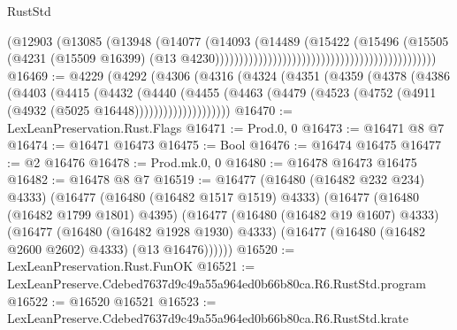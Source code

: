 \begin{lexlean}{RustStd}
\begin{coremodule}
                                                                          (@12903
                                                                            (@13085
                                                                              (@13948
                                                                                (@14077
                                                                                  (@14093
                                                                                    (@14489
                                                                                      (@15422
                                                                                        (@15496
                                                                                          (@15505
                                                                                            (@4231
                                                                                              (@15509
                                                                                                @16399)
                                                                                              (@13
                                                                                                @4230))))))))))))))))))))))))))))))))))))))))))))))
@16469 := @4229
    (@4292
      (@4306
        (@4316
          (@4324
            (@4351
              (@4359
                (@4378
                  (@4386
                    (@4403
                      (@4415
                        (@4432
                          (@4440
                            (@4455
                              (@4463
                                (@4479 (@4523 (@4752 (@4911 (@4932 (@5025 @16448))))))))))))))))))))
@16470 := LexLeanPreservation.Rust.Flags
@16471 := Prod.{0, 0}
@16473 := @16471 @8 @7
@16474 := @16471 @16473
@16475 := Bool
@16476 := @16474 @16475
@16477 := @2 @16476
@16478 := Prod.mk.{0, 0}
@16480 := @16478 @16473 @16475
@16482 := @16478 @8 @7
@16519 := @16477
    (@16480 (@16482 @232 @234) @4333)
    (@16477
      (@16480 (@16482 @1517 @1519) @4333)
      (@16477
        (@16480 (@16482 @1799 @1801) @4395)
        (@16477
          (@16480 (@16482 @19 @1607) @4333)
          (@16477
            (@16480 (@16482 @1928 @1930) @4333)
            (@16477 (@16480 (@16482 @2600 @2602) @4333) (@13 @16476))))))
@16520 := LexLeanPreservation.Rust.FunOK
@16521 := LexLeanPreserve.Cdebed7637d9c49a55a964ed0b66b80ca.R6.RustStd.program
@16522 := @16520 @16521
@16523 := LexLeanPreserve.Cdebed7637d9c49a55a964ed0b66b80ca.R6.RustStd.krate

\end{coremodule}
\end{lexlean}
